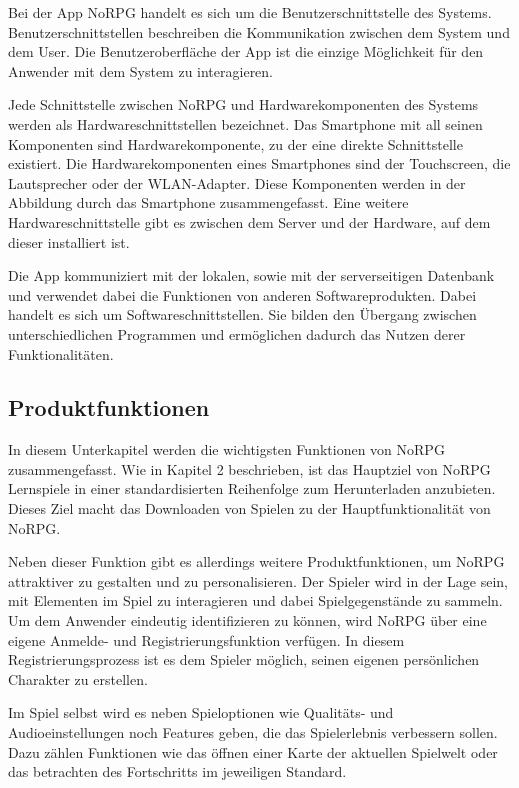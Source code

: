 		Bei der App NoRPG handelt es sich um die Benutzerschnittstelle des Systems. Benutzerschnittstellen beschreiben die Kommunikation zwischen dem System und dem User. Die Benutzeroberfläche der App ist die einzige Möglichkeit für den Anwender mit dem System zu interagieren.
		
		Jede Schnittstelle zwischen NoRPG und Hardwarekomponenten des Systems werden als Hardwareschnittstellen bezeichnet. Das Smartphone mit all seinen Komponenten sind Hardwarekomponente, zu der eine direkte  Schnittstelle existiert. Die Hardwarekomponenten eines Smartphones sind der Touchscreen, die Lautsprecher oder der WLAN-Adapter. Diese Komponenten werden in der Abbildung durch das Smartphone zusammengefasst. Eine weitere Hardwareschnittstelle gibt es zwischen dem Server und der Hardware, auf dem dieser installiert ist.
		
		Die App kommuniziert mit der lokalen, sowie mit der serverseitigen Datenbank und verwendet dabei die Funktionen von anderen Softwareprodukten. Dabei handelt es sich um Softwareschnittstellen. Sie bilden den Übergang zwischen unterschiedlichen Programmen und ermöglichen dadurch das Nutzen derer Funktionalitäten. 

	\subsection{Produktfunktionen}
		In diesem Unterkapitel werden die wichtigsten Funktionen von NoRPG zusammengefasst. Wie in Kapitel 2 beschrieben, ist das Hauptziel von NoRPG Lernspiele in einer standardisierten Reihenfolge zum Herunterladen anzubieten. Dieses Ziel macht das Downloaden von Spielen zu der Hauptfunktionalität von NoRPG. 
		
		Neben dieser Funktion gibt es allerdings weitere Produktfunktionen, um NoRPG attraktiver zu gestalten und zu personalisieren. Der Spieler wird in der Lage sein, mit Elementen im Spiel zu interagieren und dabei Spielgegenstände zu sammeln. Um dem Anwender eindeutig identifizieren zu können, wird NoRPG über eine eigene Anmelde- und Registrierungsfunktion verfügen. In diesem Registrierungsprozess ist es dem Spieler möglich, seinen eigenen persönlichen Charakter zu erstellen.
		
		Im Spiel selbst wird es neben Spieloptionen wie Qualitäts- und Audioeinstellungen noch Features geben, die das Spielerlebnis verbessern sollen. Dazu zählen Funktionen wie das öffnen einer Karte der aktuellen Spielwelt oder das betrachten des Fortschritts im jeweiligen Standard.
		
